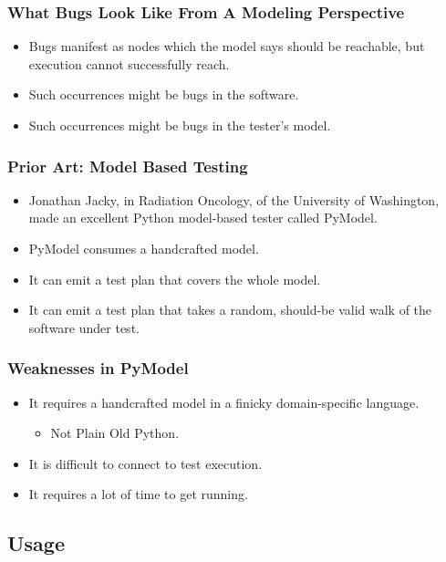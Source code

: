 \begin{frame}
  \frametitle{What Bugs Look Like From A Modeling Perspective}
  \begin{itemize}
    \item Bugs manifest as nodes which the model says should be reachable, but execution cannot successfully reach.
    \item Such occurrences might be bugs in the software.
    \item Such occurrences might be bugs in the tester's model.
  \end{itemize}
\end{frame}

\begin{frame}
  \frametitle{Prior Art: Model Based Testing}
  \begin{itemize}
    \item Jonathan Jacky, in Radiation Oncology, of the University of Washington, made an excellent Python model-based tester called PyModel.
    \item PyModel consumes a handcrafted model.
    \item It can emit a test plan that covers the whole model.
    \item It can emit a test plan that takes a random, should-be valid walk of the software under test.
  \end{itemize}
\end{frame}

\begin{frame}
  \frametitle{Weaknesses in PyModel}
  \begin{itemize}
    \item It requires a handcrafted model in a finicky domain-specific language.
    \begin{itemize}
      \item Not Plain Old Python.
    \end{itemize}
    \item It is difficult to connect to test execution.
    \item It requires a lot of time to get running.
  \end{itemize}
\end{frame}

\subsection{Usage}

